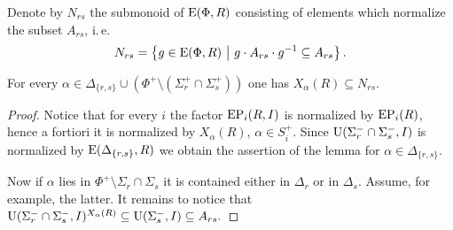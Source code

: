 Denote by $N_{rs}$ the submonoid of $\operatorname{E}(\Phi, R)$ consisting of elements which normalize the subset $A_{rs}$, i.\,e.
\[ N_{rs} = \left\{ g\in \E(\Phi, R)\ \middle|\ g \cdot A_{rs} \cdot g^{-1} \subseteq A_{rs} \right\}. \]

\begin{lemma}\label{lemma:dv-normal} 
For every $\alpha \in \Delta_{\{r,s\}} \cup (\Phi^+ \setminus (\Sigma^+_r \cap \Sigma^+_s))$ one has $X_\alpha(R) \subseteq N_{rs}$. \end{lemma}
\begin{proof}
Notice that for every $i$ the factor $\operatorname{EP}_i(R, I)$ is normalized by $\operatorname{EP}_i(R)$, hence a fortiori it is normalized by $X_\alpha(R)$, $\alpha \in S_i^+$.
Since $\operatorname{U}(\Sigma_r^- \cap \Sigma_s^-, I)$ is normalized by $\operatorname{E}(\Delta_{\{r,s\}}, R)$ we obtain the assertion of the lemma for $\alpha \in \Delta_{\{r, s\}}$.

Now if $\alpha$ lies in $\Phi^+ \setminus \Sigma_r \cap \Sigma_s$ it is contained either in $\Delta_r$ or in $\Delta_s$.
Assume, for example, the latter. It remains to notice that $\operatorname{U}(\Sigma_r^- \cap \Sigma_s^-, I)^{X_\alpha(R)} \subseteq \operatorname{U}(\Sigma_s^-, I) \subseteq A_{rs}.$
\end{proof}

